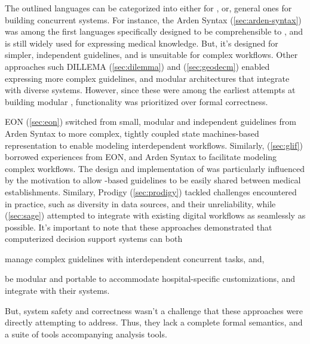 The outlined languages can be categorized into either \DSLs{} for \CIGs{},
or, general ones for building concurrent systems. For instance,
the Arden Syntax (\autoref{sec:arden-syntax})
was among the first languages specifically designed to be
comprehensible to \HCPs{}, and is still widely used for expressing medical
knowledge. But, it's designed for simpler, independent guidelines, and
is unsuitable for complex workflows. Other approaches
such DILLEMA (\autoref{sec:dilemma}) and \GEODECM{}
(\autoref{sec:geodecm}) enabled expressing more complex guidelines,
and modular architectures that integrate with diverse systems.
However, since these were among the earliest attempts at building modular \CDSSs{},
functionality was prioritized over formal correctness.

EON (\autoref{sec:eon}) switched from small, modular and
independent guidelines from Arden Syntax to more complex,
tightly coupled state machines-based representation to enable modeling
interdependent workflows. Similarly, \GLIF{} (\autoref{sec:glif}) borrowed experiences from
EON, \GEODECM{} and Arden Syntax to facilitate modeling complex workflows.
The design and implementation of \GLIF{} was particularly influenced
by the motivation to allow \GLIF{}-based guidelines to be easily shared
between medical establishments. Similary, Prodigy (\autoref{sec:prodigy})
tackled \CDSSs{} challenges encountered in practice, such as diversity in
data sources, and their unreliability, while \SAGE{} (\autoref{sec:sage})
attempted to integrate with existing digital workflows as seamlessly as
possible. It's important to note that these approaches demonstrated that computerized decision support
systems can both
\begin{enumerate*}[label=(\alph*)]
  \item manage complex guidelines with interdependent concurrent tasks, and,
  \item be modular and portable to accommodate hospital-specific customizations,
    and integrate with their \EHR{} systems.
\end{enumerate*}
But, system safety and correctness wasn't a challenge that these approaches
were directly attempting to address.
Thus, they lack a complete formal semantics, and a suite of tools accompanying
analysis tools.

